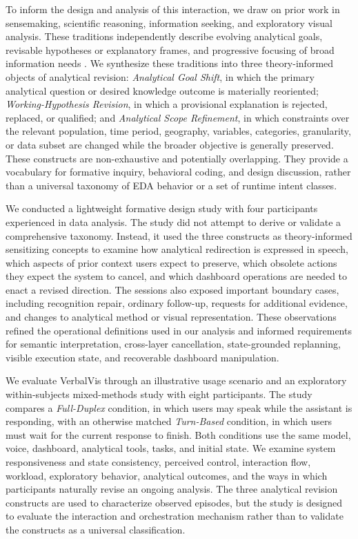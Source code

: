 \documentclass[journal]{IEEEtran}
\begin{document}
To inform the design and analysis of this interaction, we draw on prior work
in sensemaking, scientific reasoning, information seeking, and exploratory
visual analysis. These traditions independently describe evolving analytical
goals, revisable hypotheses or explanatory frames, and progressive focusing
of broad information needs
\cite{pirolli2005sensemaking,klein2007dataframe,
klahr1988dual,bates1989berrypicking,vakkari2001changes,
battle2019characterizing}. We synthesize these traditions into three
theory-informed objects of analytical revision:
\emph{Analytical Goal Shift}, in which the primary analytical question or
desired knowledge outcome is materially reoriented;
\emph{Working-Hypothesis Revision}, in which a provisional explanation is
rejected, replaced, or qualified; and
\emph{Analytical Scope Refinement}, in which constraints over the relevant
population, time period, geography, variables, categories, granularity, or
data subset are changed while the broader objective is generally preserved.
These constructs are non-exhaustive and potentially overlapping. They provide
a vocabulary for formative inquiry, behavioral coding, and design discussion,
rather than a universal taxonomy of EDA behavior or a set of runtime intent
classes.

We conducted a lightweight formative design study with four participants
experienced in data analysis. The study did not attempt to derive or validate
a comprehensive taxonomy. Instead, it used the three constructs as
theory-informed sensitizing concepts to examine how analytical redirection is
expressed in speech, which aspects of prior context users expect to preserve,
which obsolete actions they expect the system to cancel, and which dashboard
operations are needed to enact a revised direction. The sessions also exposed
important boundary cases, including recognition repair, ordinary follow-up,
requests for additional evidence, and changes to analytical method or visual
representation. These observations refined the operational definitions used
in our analysis and informed requirements for semantic interpretation,
cross-layer cancellation, state-grounded replanning, visible execution state,
and recoverable dashboard manipulation.

We evaluate VerbalVis through an illustrative usage scenario and an exploratory
within-subjects mixed-methods study with eight participants. The study compares
a \emph{Full-Duplex} condition, in which users may speak while the assistant is
responding, with an otherwise matched \emph{Turn-Based} condition, in which
users must wait for the current response to finish. Both conditions use the
same model, voice, dashboard, analytical tools, tasks, and initial state. We
examine system responsiveness and state consistency, perceived control,
interaction flow, workload, exploratory behavior, analytical outcomes, and
the ways in which participants naturally revise an ongoing analysis. The
three analytical revision constructs are used to characterize observed
episodes, but the study is designed to evaluate the interaction and
orchestration mechanism rather than to validate the constructs as a universal
classification.
\end{document}
